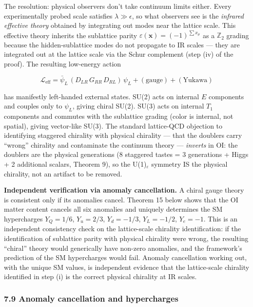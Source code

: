 \documentclass[
  11pt,
]{article}
\begin{document}
The resolution: physical observers don't take continuum limits either.
Every experimentally probed scale satisfies \(\lambda \gg \epsilon\), so
what observers see is the \emph{infrared effective theory} obtained by
integrating out modes near the lattice scale. This effective theory
inherits the sublattice parity
\(\varepsilon(\mathbf{x}) = (-1)^{\sum x_\mu}\) as a \(\mathbb{Z}_2\)
grading because the hidden-sublattice modes do not propagate to IR
scales --- they are integrated out at the lattice scale via the Schur
complement (step (iv) of the proof). The resulting low-energy action

\[\mathcal{L}_{\text{eff}} = \bar\psi_L \, (D_{LR} \, G_{RR} \, D_{RL}) \, \psi_L + (\text{gauge}) + (\text{Yukawa})\]

has manifestly left-handed external states. SU(2) acts on internal \(E\)
components and couples only to \(\psi_L\), giving chiral SU(2). SU(3)
acts on internal \(T_1\) components and commutes with the sublattice
grading (color is internal, not spatial), giving vector-like SU(3). The
standard lattice-QCD objection to identifying staggered chirality with
physical chirality --- that the doublers carry ``wrong'' chirality and
contaminate the continuum theory --- \emph{inverts} in OI: the doublers
are the physical generations (8 staggered tastes = 3 generations + Higgs
+ 2 additional scalars, Theorem 9), so the U(1)\(_\varepsilon\) symmetry
IS the physical chirality, not an artifact to be removed.

\textbf{Independent verification via anomaly cancellation.} A chiral
gauge theory is consistent only if its anomalies cancel. Theorem 15
below shows that the OI matter content cancels all six anomalies and
uniquely determines the SM hypercharges \(Y_Q = 1/6\), \(Y_u = 2/3\),
\(Y_d = -1/3\), \(Y_L = -1/2\), \(Y_e = -1\). This is an independent
consistency check on the lattice-scale chirality identification: if the
identification of sublattice parity with physical chirality were wrong,
the resulting ``chiral'' theory would generically have non-zero
anomalies, and the framework's prediction of the SM hypercharges would
fail. Anomaly cancellation working out, with the unique SM values, is
independent evidence that the lattice-scale chirality identified in step
(i) is the correct physical chirality at IR scales.

\hypertarget{anomaly-cancellation-and-hypercharges}{%
\subsubsection{7.9 Anomaly cancellation and
hypercharges}\label{anomaly-cancellation-and-hypercharges}}
\end{document}
